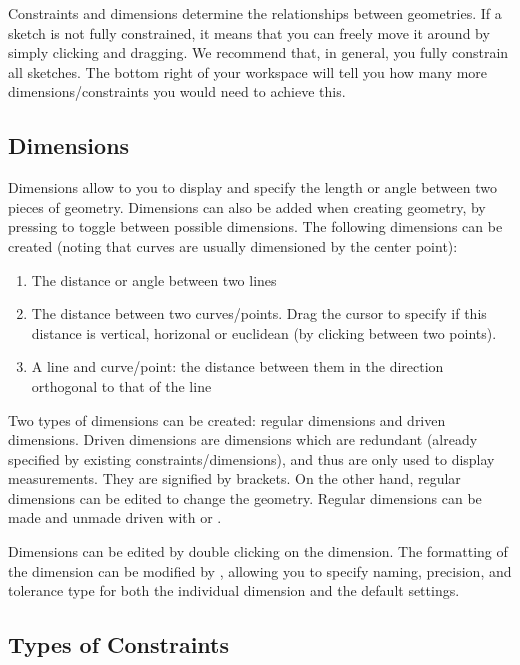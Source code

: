 \easydifficulty
Constraints and dimensions determine the relationships between geometries. If a sketch is not fully constrained, it means that you can freely move it around by simply clicking and dragging. We recommend that, in general, you fully constrain all sketches. The bottom right of your workspace will tell you how many more dimensions/constraints you would need to achieve this.


\subsection{Dimensions}
Dimensions allow to you to display and specify the length or angle between two pieces of geometry. Dimensions can also be added when creating geometry, by pressing  to toggle between possible dimensions. The following dimensions can be created (noting that curves are usually dimensioned by the center point):

\begin{enumerate}
\item The distance or angle between two lines
\item The distance between two curves/points. Drag the cursor to specify if this distance is vertical, horizonal or euclidean (by clicking between two points).
\item A line and curve/point: the distance between them in the direction orthogonal to that of the line
\end{enumerate}

Two types of dimensions can be created: regular dimensions and driven dimensions. Driven dimensions are dimensions which are redundant (already specified by existing constraints/dimensions), and thus are only used to display measurements. They are signified by brackets. On the other hand, regular dimensions can be edited to change the geometry. Regular dimensions can be made and unmade driven with  or .

Dimensions can be edited by double clicking on the dimension. The formatting of the dimension can be modified by , allowing you to specify naming, precision, and tolerance type for both the individual dimension and the default settings.


\subsection{Types of Constraints}
\label{subchap:constraint-types}

